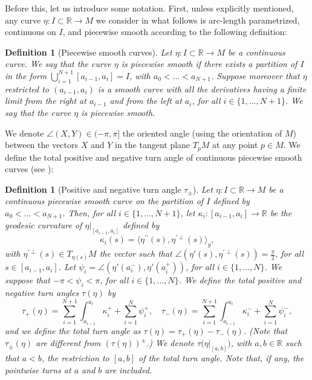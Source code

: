 \documentclass{article}
\newcommand{\R}{\mathbb{R}}
\newcommand{\surf}{M}
\newcommand{\ko}{\kappa}
\newtheorem{definitionE}[theorem]{Definition}
\theoremstyle{remark}
\theoremstyle{prpart}
\begin{document}
Before this, let us introduce some notation. First, unless explicitly mentioned, any curve $\eta:I\subset \R\to\surf$ we consider in what follows is arc-length parametrized, continuous on $I$, and piecewise smooth according to the following definition:
\begin{definitionE}[Piecewise smooth curves]\label{def:piecewise}
  Let $\eta:I\subset \R\to\surf$ be a continuous curve. We say that the curve $\eta$ is \emph{piecewise smooth} if there exists a partition of $I$ in the form $\bigcup_{i=1}^{N+1} [a_{i-1},a_i]=I$, with $a_0<...<a_{N+1}$. Suppose moreover that $\eta$ restricted to $(a_{i-1},a_{i})$ is a smooth curve with all the derivatives having a finite limit from the right at $a_{i-1}$ and from the left at $a_{i}$, for all $i\in\{1,...,N+1\}$. We say that the curve $\eta$ is piecewise smooth.
\end{definitionE}
 We denote $\angle(X,Y)\in(-\pi,\pi]$ the oriented angle (using the orientation of $\surf$) between the vectors $X$ and $Y$ in the tangent plane $T_p\surf$ at any point $p\in\surf$. We define the total positive and negative turn angle of continuous piecewise smooth curves (see \cite{Bur05}):
\begin{definitionE}[Positive and negative turn angle $\tau_\pm$]
 Let $\eta:I\subset\R\to\surf$ be a continuous piecewise smooth curve on the partition of $I$ defined by $a_0<...<a_{N+1}$. Then, for all $i\in\{1,...,N+1\}$, let $\ko_i:[a_{i-1},a_{i}]\to\R$ be the geodesic curvature of $\eta\big|_{[a_{i-1},a_{i}]}$ defined by 
\begin{equation*}
  \ko_i(s) = \langle \eta^{\prime\prime}(s), \eta^{\prime\perp}(s)\rangle_g,
\end{equation*}
with $\eta^{\prime\perp}(s)\in T_{\eta(s)}\surf$ the vector such that $\angle(\eta'(s),\eta^{\prime\perp}(s))=\frac{\pi}{2}$, for all $s\in [a_{i-1},a_{i}]$.
Let $\psi_i = \angle(\eta'(a_i^-),\eta'(a_i^+))$, for all $i\in\{1,...,N\}$. We suppose that $-\pi<\psi_i<\pi$, for all $i\in\{1,...,N\}$. We define the total positive and negative \emph{turn angles} $\tau(\eta)$ by
\begin{equation}\label{eq:int-curv}
\tau_+(\eta) = \sum_{i=1}^{N+1}\int_{a_{i-1}}^{a_{i}}\ko_i^+ + \sum_{i=1}^N\psi_i^+,
\quad \tau_-(\eta) = \sum_{i=1}^{N+1}\int_{a_{i-1}}^{a_{i}}\ko_i^- + \sum_{i=1}^N\psi_i^-,
\end{equation}
and we define the total \emph{turn angle} as $\tau(\eta) = \tau_+(\eta)-\tau_-(\eta)$. (Note that $\tau_{\pm}(\eta)$ are different from $(\tau(\eta))^\pm$.) We denote $\tau\big(\eta\big|_{[a,b]})$, with $a,b\in\R$ such that $a<b$, the restriction to $[a,b]$ of the total turn angle. Note that, if any, the pointwise turns at $a$ and $b$ are included.
\end{definitionE}
\end{document}
